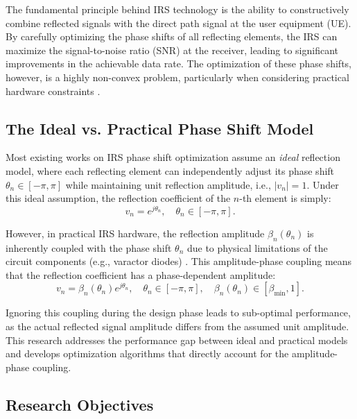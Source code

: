 \documentclass[12pt,a4paper]{article}
\begin{document}
The fundamental principle behind IRS technology is the ability to constructively combine reflected signals with the direct path signal at the user equipment (UE). By carefully optimizing the phase shifts of all reflecting elements, the IRS can maximize the signal-to-noise ratio (SNR) at the receiver, leading to significant improvements in the achievable data rate. The optimization of these phase shifts, however, is a highly non-convex problem, particularly when considering practical hardware constraints \cite{abeywickrama2020intelligent}.

\subsection{The Ideal vs. Practical Phase Shift Model}

Most existing works on IRS phase shift optimization assume an \textit{ideal} reflection model, where each reflecting element can independently adjust its phase shift $\theta_n \in [-\pi, \pi]$ while maintaining unit reflection amplitude, i.e., $|v_n| = 1$. Under this ideal assumption, the reflection coefficient of the $n$-th element is simply:
\begin{equation}
    v_n = e^{j\theta_n}, \quad \theta_n \in [-\pi, \pi].
    \label{eq:ideal_model}
\end{equation}

However, in practical IRS hardware, the reflection amplitude $\beta_n(\theta_n)$ is inherently coupled with the phase shift $\theta_n$ due to physical limitations of the circuit components (e.g., varactor diodes) \cite{abeywickrama2020intelligent}. This amplitude-phase coupling means that the reflection coefficient has a phase-dependent amplitude:
\begin{equation}
    v_n = \beta_n(\theta_n) e^{j\theta_n}, \quad \theta_n \in [-\pi, \pi], \quad \beta_n(\theta_n) \in [\beta_{\min}, 1].
    \label{eq:practical_model}
\end{equation}

Ignoring this coupling during the design phase leads to sub-optimal performance, as the actual reflected signal amplitude differs from the assumed unit amplitude. This research addresses the performance gap between ideal and practical models and develops optimization algorithms that directly account for the amplitude-phase coupling.

\subsection{Research Objectives}
\end{document}
